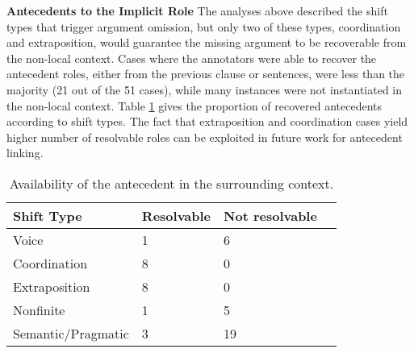 \documentclass[11pt]{article}
\begin{document}
{\bf  \flushleft Antecedents to the Implicit Role}
The analyses above described the shift types that trigger argument omission, but only two of these types, coordination and extraposition, would guarantee the missing argument to be recoverable from the non-local context. Cases where the annotators were able to recover the antecedent roles, either from the previous clause or sentences, were less than the majority (21 out of the 51 cases), while many instances were not instantiated in the non-local context. Table \ref{antecedent} gives the proportion of recovered antecedents according to shift types. The fact that extraposition and coordination cases yield higher number of resolvable roles can be exploited in future work for antecedent linking.

\begin{table}[h]
\centering
\begin{tabular}{lllr}
\hline
\cline{1-3}
\small
Shift Type  & \small Resolvable &  \small Not resolvable  \\
\hline
\small Voice     & \small 1 & \small 6    \\
\small Coordination   & \small 8 &  \small 0     \\
\small Extraposition & \small 8 &  \small 0    \\
\small Nonfinite    & \small 1 & \small  5     \\
\small Semantic/Pragmatic  & \small  3 &  \small 19      \\
\hline
\end{tabular}
\caption{Availability of the antecedent in the surrounding context.}
\label{antecedent}
\end{table}


\end{document}
